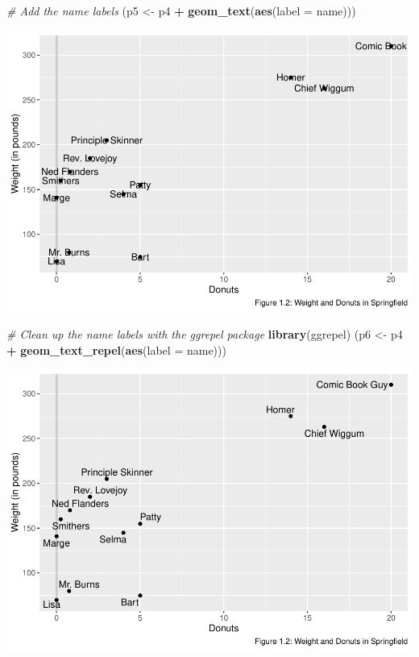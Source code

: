 \documentclass[]{book}
\newenvironment{Shaded}{\begin{snugshade}}{\end{snugshade}}
\newcommand{\CommentTok}[1]{\textcolor[rgb]{0.56,0.35,0.01}{\textit{#1}}}
\newcommand{\DataTypeTok}[1]{\textcolor[rgb]{0.13,0.29,0.53}{#1}}
\newcommand{\KeywordTok}[1]{\textcolor[rgb]{0.13,0.29,0.53}{\textbf{#1}}}
\newcommand{\NormalTok}[1]{#1}
\newcommand{\OperatorTok}[1]{\textcolor[rgb]{0.81,0.36,0.00}{\textbf{#1}}}
\newcommand{\StringTok}[1]{\textcolor[rgb]{0.31,0.60,0.02}{#1}}
\begin{document}
\begin{Shaded}
\begin{Highlighting}[]
\CommentTok{# Add the name labels}
\NormalTok{(p5 <-}\StringTok{ }\NormalTok{p4 }\OperatorTok{+}\StringTok{ }\KeywordTok{geom_text}\NormalTok{(}\KeywordTok{aes}\NormalTok{(}\DataTypeTok{label =}\NormalTok{ name)))}
\end{Highlighting}
\end{Shaded}

\includegraphics{bailey_files/figure-latex/unnamed-chunk-3-4.pdf}

\begin{Shaded}
\begin{Highlighting}[]
\CommentTok{# Clean up the name labels with the ggrepel package}
\KeywordTok{library}\NormalTok{(ggrepel)}
\NormalTok{(p6 <-}\StringTok{ }\NormalTok{p4 }\OperatorTok{+}\StringTok{ }\KeywordTok{geom_text_repel}\NormalTok{(}\KeywordTok{aes}\NormalTok{(}\DataTypeTok{label =}\NormalTok{ name)))}
\end{Highlighting}
\end{Shaded}

\includegraphics{bailey_files/figure-latex/unnamed-chunk-3-5.pdf}
\end{document}
